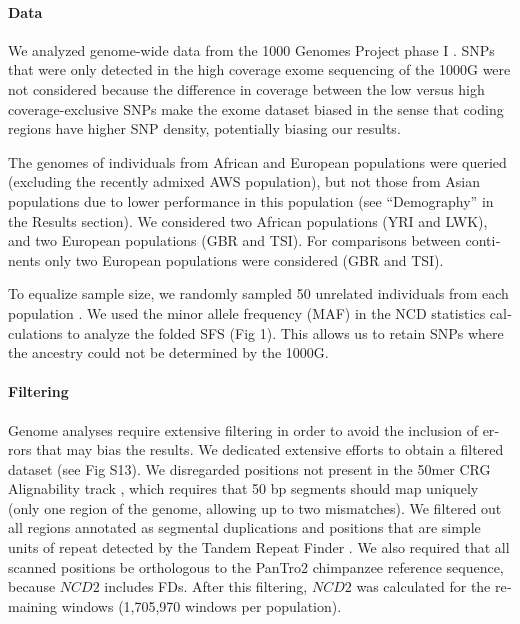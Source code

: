 \begin{refsection}
\begin{otherlanguage}{english}
\paragraph{Data} We analyzed genome-wide data from the 1000 Genomes Project phase I \parencite{Abecasis2012}. SNPs that were only detected in the high coverage exome sequencing of the 1000G were not considered because the difference in coverage between the low versus high coverage-exclusive SNPs make the exome dataset biased in the sense that coding regions have higher SNP density, potentially biasing our results. 

The genomes of individuals from African and European populations were queried (excluding the recently admixed AWS population), but not those from Asian populations due to lower performance in this population (see “Demography” in the Results section). We considered two African populations (YRI and LWK), and two European populations (GBR and TSI). For comparisons between continents only two European populations were considered (GBR and TSI). 

To equalize sample size, we randomly sampled 50 unrelated individuals from each population \parencite{Key2014}. We used the minor allele frequency (MAF) in the NCD statistics calculations to analyze the folded SFS (Fig 1). This allows us to retain SNPs where the ancestry could not be determined by the 1000G.\nocite{Abecasis2012}

\paragraph{Filtering} Genome analyses require extensive filtering in order to avoid the inclusion of errors that may bias the results. We dedicated extensive efforts to obtain a filtered dataset (see Fig S13). We disregarded positions not present in the 50mer CRG Alignability track \parencite{Derrien2012}, which requires that 50 bp segments should map uniquely (only one region of the genome, allowing up to two mismatches). We filtered out all regions annotated as segmental duplications \parencite{Alkan2009,Cheng2005} and positions that are simple units of repeat detected by the Tandem Repeat Finder \parencite{Benson1999}. We also required that all scanned positions be orthologous to the PanTro2 chimpanzee reference sequence, because $NCD2$ includes FDs. After this filtering, $NCD2$ was calculated for the remaining windows (1,705,970 windows per population). 

\end{otherlanguage}
\end{refsection}
